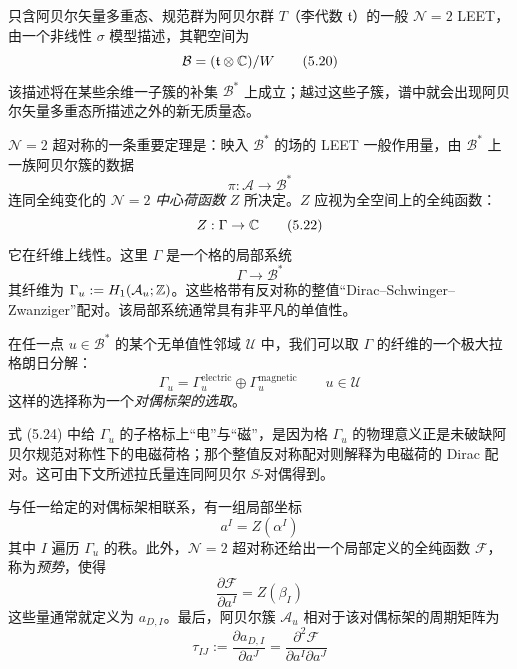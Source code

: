 只含阿贝尔矢量多重态、规范群为阿贝尔群 $T$（李代数 $\mathfrak{t}$）的一般 $\mathcal{N}=2$ LEET，由一个非线性 $\sigma$ 模型描述，其靶空间为
\begin{equation}
\mathcal{B}=(\mathfrak{t}\otimes\mathbb{C})/W
\tag{5.20}
\end{equation}
该描述将在某些余维一子簇的补集 $\mathcal{B}^{*}$ 上成立；越过这些子簇，谱中就会出现阿贝尔矢量多重态所描述之外的新无质量态。

$\mathcal{N}=2$ 超对称的一条重要定理是：映入 $\mathcal{B}^{*}$ 的场的 LEET 一般作用量，由 $\mathcal{B}^{*}$ 上一族阿贝尔簇的数据
\begin{equation}
\pi:\mathcal{A}\to\mathcal{B}^{*}
\tag{5.21}
\end{equation}
连同全纯变化的 $\mathcal{N}=2$ \emph{中心荷函数} $Z$ 所决定。$Z$ 应视为全空间上的全纯函数：
\begin{equation}
Z:\Gamma\to\mathbb{C}
\tag{5.22}
\end{equation}
它在纤维上线性。这里 $\Gamma$ 是一个格的局部系统
\begin{equation}
\Gamma\to\mathcal{B}^{*}
\tag{5.23}
\end{equation}
其纤维为 $\Gamma_{u}:=H_{1}(\mathcal{A}_{u};\mathbb{Z})$。这些格带有反对称的整值“Dirac--Schwinger--Zwanziger”配对。该局部系统通常具有非平凡的单值性。

在任一点 $u\in\mathcal{B}^{*}$ 的某个无单值性邻域 $\mathcal{U}$ 中，我们可以取 $\Gamma$ 的纤维的一个极大拉格朗日分解：
\begin{equation}
\Gamma_{u}=\Gamma_{u}^{\text{electric}}\oplus\Gamma_{u}^{\text{magnetic}}
\qquad u\in\mathcal{U}
\tag{5.24}
\end{equation}
这样的选择称为一个\emph{对偶标架的选取}。

式 (5.24) 中给 $\Gamma_{u}$ 的子格标上“电”与“磁”，是因为格 $\Gamma_{u}$ 的物理意义正是未破缺阿贝尔规范对称性下的电磁荷格；那个整值反对称配对则解释为电磁荷的 Dirac 配对。这可由下文所述拉氏量连同阿贝尔 $S$-对偶得到。

与任一给定的对偶标架相联系，有一组局部坐标
\begin{equation}
a^{I}=Z(\alpha^{I})
\tag{5.25}
\end{equation}
其中 $I$ 遍历 $\Gamma_{u}$ 的秩。此外，$\mathcal{N}=2$ 超对称还给出一个局部定义的全纯函数 $\mathcal{F}$，称为\emph{预势}，使得
\begin{equation}
\frac{\partial\mathcal{F}}{\partial a^{I}}=Z(\beta_{I})
\tag{5.26}
\end{equation}
这些量通常就定义为 $a_{D,I}$。最后，阿贝尔簇 $\mathcal{A}_{u}$ 相对于该对偶标架的周期矩阵为
\begin{equation}
\tau_{IJ}:=\frac{\partial a_{D,I}}{\partial a^{J}}
=\frac{\partial^{2}\mathcal{F}}{\partial a^{I}\partial a^{J}}
\tag{5.27}
\end{equation}

